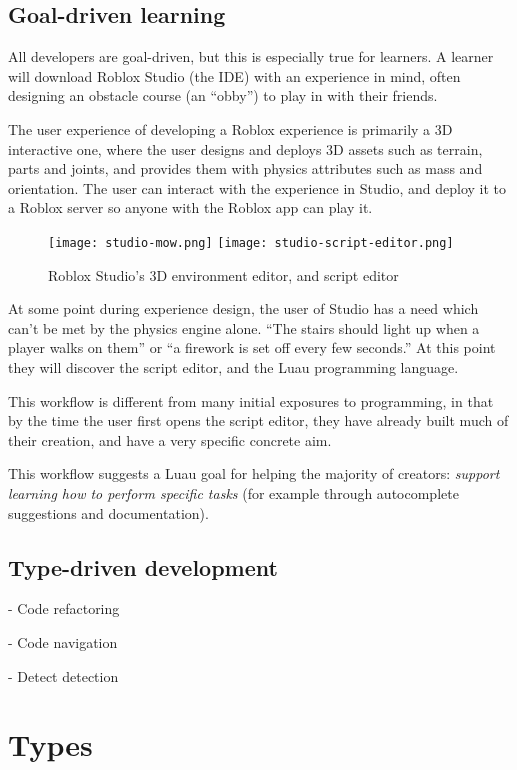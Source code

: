 \documentclass[acmsmall]{acmart}
\begin{document}
\subsection{Goal-driven learning}

All developers are goal-driven, but this is especially true for
learners. A learner will download Roblox Studio (the IDE) with an
experience in mind, often designing an obstacle course (an ``obby'')
to play in with their friends.

The user experience of developing a Roblox experience is
primarily a 3D interactive one, where the user designs and deploys 3D
assets such as terrain, parts and joints, and provides them with
physics attributes such as mass and orientation. The user can interact
with the experience in Studio, and deploy it to a Roblox server so anyone with
the Roblox app can play it.

\begin{figure}
\texttt{[image: studio-mow.png]}
\texttt{[image: studio-script-editor.png]}
\caption{Roblox Studio's 3D environment editor, and script editor}
\end{figure}

At some point during experience design, the user of Studio has a need
which can't be met by the physics engine alone. ``The stairs should
light up when a player walks on them'' or ``a firework is set off
every few seconds.'' At this point they will discover the script
editor, and the Luau programming language.

This workflow is different from many initial exposures to programming,
in that by the time the user first opens the script editor, they have
already built much of their creation, and have a very specific
concrete aim.

This workflow suggests a Luau goal for helping the majority of
creators: \emph{support learning how to perform specific tasks} (for
example through autocomplete suggestions and documentation).

\subsection{Type-driven development}

- Code refactoring

- Code navigation

- Detect detection

\section{Types}
\end{document}
